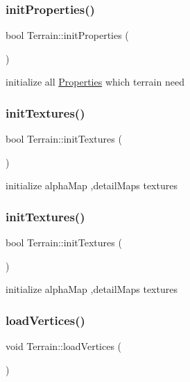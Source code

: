 \subsubsection{\texorpdfstring{init\+Properties()}{initProperties()}\hspace{0.1cm}{\footnotesize\ttfamily [2/2]}}
{\footnotesize\ttfamily bool Terrain\+::init\+Properties (\begin{DoxyParamCaption}{ }\end{DoxyParamCaption})}

initialize all \hyperlink{classProperties}{Properties} which terrain need \mbox{\label{classTerrain_af88878ee2f37979ede7656062e19190f}} 
\subsubsection{\texorpdfstring{init\+Textures()}{initTextures()}\hspace{0.1cm}{\footnotesize\ttfamily [1/2]}}
{\footnotesize\ttfamily bool Terrain\+::init\+Textures (\begin{DoxyParamCaption}{ }\end{DoxyParamCaption})}

initialize alpha\+Map ,detail\+Maps textures \mbox{\label{classTerrain_af88878ee2f37979ede7656062e19190f}} 
\subsubsection{\texorpdfstring{init\+Textures()}{initTextures()}\hspace{0.1cm}{\footnotesize\ttfamily [2/2]}}
{\footnotesize\ttfamily bool Terrain\+::init\+Textures (\begin{DoxyParamCaption}{ }\end{DoxyParamCaption})}

initialize alpha\+Map ,detail\+Maps textures \mbox{\label{classTerrain_aac8d9ca975f6b0050c49f7cb3c2f37ad}} 
\subsubsection{\texorpdfstring{load\+Vertices()}{loadVertices()}\hspace{0.1cm}{\footnotesize\ttfamily [1/2]}}
{\footnotesize\ttfamily void Terrain\+::load\+Vertices (\begin{DoxyParamCaption}{ }\end{DoxyParamCaption})\hspace{0.3cm}{\ttfamily [protected]}}

